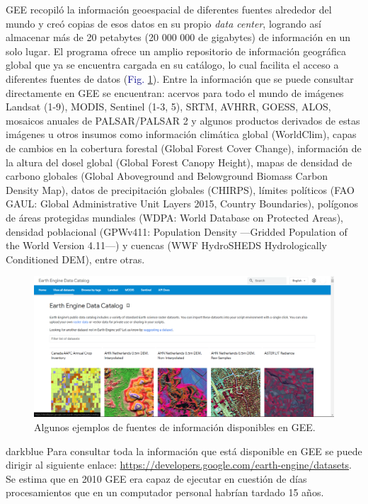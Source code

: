 \documentclass[
  12pt,
  letterpaper,
  twoside]{book}
\begin{document}
GEE recopiló la información geoespacial de diferentes fuentes alrededor del mundo y creó copias de esos datos en su propio \emph{data center}, logrando así almacenar más de 20 petabytes (20 000 000 de gigabytes) de información en un solo lugar. El programa ofrece un amplio repositorio de información geográfica global que ya se encuentra cargada en su catálogo, lo cual facilita el acceso a diferentes fuentes de datos (\textcolor{darkblue}{Fig.} \ref{fig:f11}). Entre la información que se puede consultar directamente en GEE se encuentran: acervos para todo el mundo de imágenes Landsat (1-9), MODIS, Sentinel (1-3, 5), SRTM, AVHRR, GOESS, ALOS, mosaicos anuales de PALSAR/PALSAR 2 y algunos productos derivados de estas imágenes u otros insumos como información climática global (WorldClim), capas de cambios en la cobertura forestal (Global Forest Cover Change), información de la altura del dosel global (Global Forest Canopy Height), mapas de densidad de carbono globales (Global Aboveground and Belowground Biomass Carbon Density Map), datos de precipitación globales (CHIRPS), límites políticos (FAO GAUL: Global Administrative Unit Layers 2015, Country Boundaries), polígonos de áreas protegidas mundiales (WDPA: World Database on Protected Areas), densidad poblacional (GPWv411: Population Density ---Gridded Population of the World Version 4.11---) y cuencas (WWF HydroSHEDS Hydrologically Conditioned DEM), entre otras.

\begin{figure}[H]

{\centering \includegraphics[width=0.95\linewidth]{Img/Datasets} 

}

\caption{Algunos ejemplos de fuentes de información disponibles en GEE.}\label{fig:f11}
\end{figure}

\begin{bluebox2}

\begin{awesomeblock}{5pt}{\faLightbulb}{darkblue}
Para consultar toda la información que está disponible en GEE se puede dirigir al siguiente enlace: \url{https://developers.google.com/earth-engine/datasets}. Se estima que en 2010 GEE era capaz de ejecutar en cuestión de días procesamientos que en un computador personal habrían tardado 15 años.

\end{awesomeblock}

\end{bluebox2}
\end{document}
